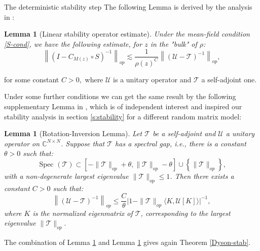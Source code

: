 \documentclass[11pt, a4paper, oneside]{book}
\numberwithin{equation}{chapter}
\newtheorem{lem}[thm]{Lemma}
\begin{document}
\begin{section}{The deterministic stability step}
The following Lemma is derived by the analysis in \cite{ajanki2019stability}:
%
\begin{lem}[Linear stability operator estimate] \label{lso-estimate} Under the mean-field condition \eqref{S-cond}, we have the following estimate, for $z$ in the "bulk" of $\rho$:
\[
\left \| ( I - C_{M(z)} \circ S )^{-1} \right \|_{op} \lesssim \frac{1}{\rho(z)^C} \left \| \left ( \mathcal{U} - \mathcal{T} \right )^{-1} \right \|_{op},
\]
\end{lem}
for some constant $C>0,$ where $\mathcal{U}$ is a unitary operator and $\mathcal{T}$ a self-adjoint one.

Under some further conditions we can get the same result by the following supplementary Lemma in \cite{ajanki2019stability}, which is of independent interest and inspired our stability analysis in section \ref{s:stability} for a different random matrix model:
%
\begin{lem}[Rotation-Inversion Lemma] \label{rotate-inverse}
Let $\mathcal{T}$ be a self-adjoint and $\mathcal{U}$ a unitary operator on $\mathbb{C}^{N \times N}$. Suppose that $\mathcal{T}$ has a spectral gap, i.e., there is a constant $\theta>0$ such that:
$$
\text { Spec } (\mathcal{T}) \subset \left[-\|\mathcal{T}\|_{{op}}+\theta,\|\mathcal{T}\|_{{op}}-\theta\right] \cup\left\{\|\mathcal{T}\|_{{op}}\right\},
$$
with a non-degenerate largest eigenvalue $\|\mathcal{T}\|_{op} \leq 1$. Then there exists a constant $C>0$ such that:
$$
\left\|(\mathcal{U}-\mathcal{T})^{-1}\right\|_{op} \leq \frac{C}{\theta} \bigg| 1-\|\mathcal{T}\|_{op}\langle K, \mathcal{U}[K] \rangle \bigg |^{-1},
$$
where $K$ is the normalized eigenmatrix of $\mathcal{T}$, corresponding to the largest eigenvalue $\|\mathcal{T}\|_{op}.$
\end{lem}
%
The combination of Lemma \ref{lso-estimate} and Lemma \ref{rotate-inverse} gives again Theorem \ref{Dyson-stab}.

\end{section}
\end{document}
